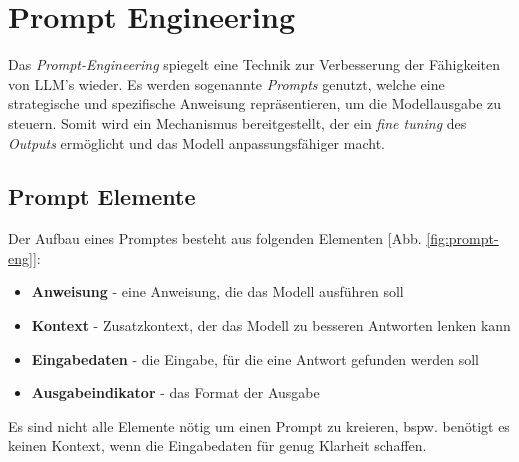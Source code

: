 \section{Prompt Engineering}
Das \textit{Prompt-Engineering} spiegelt eine Technik zur Verbesserung der Fähigkeiten von LLM's wieder. Es werden sogenannte \textit{Prompts} genutzt, welche eine strategische und spezifische Anweisung repräsentieren, um die Modellausgabe zu steuern. Somit wird ein Mechanismus bereitgestellt, der ein \textit{fine tuning} des \textit{Outputs} ermöglicht und das Modell anpassungsfähiger macht. \cite*{sahooSystematicSurveyPrompt2024} 

\subsection{Prompt Elemente}
Der Aufbau eines Promptes besteht aus folgenden Elementen [Abb. \ref{fig:prompt-eng}]:
\begin{itemize}
    \setlength{\parskip}{1pt}
    \item \textbf{Anweisung} - eine Anweisung, die das Modell ausführen soll
    \item \textbf{Kontext} - Zusatzkontext, der das Modell zu besseren Antworten lenken kann
    \item \textbf{Eingabedaten} - die Eingabe, für die eine Antwort gefunden werden soll
    \item \textbf{Ausgabeindikator} - das Format der Ausgabe
\end{itemize}
Es sind nicht alle Elemente nötig um einen Prompt zu kreieren, bspw. benötigt es keinen Kontext, wenn die Eingabedaten für genug Klarheit schaffen. \cite*{ElementsPromptNextra2024}

